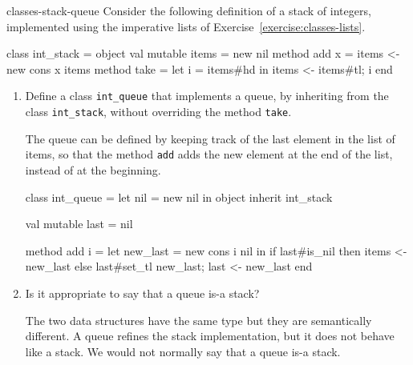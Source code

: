 %
\begin{exercise}{classes-stack-queue}
Consider the following definition of a stack of integers, implemented using the
imperative lists of Exercise~\ref{exercise:classes-lists}.

\begin{ocaml}
class int_stack =
object
    val mutable items = new nil
    method add x = items <- new cons x items
    method take =
        let i = items#hd in
        items <- items#tl;
        i
end
\end{ocaml}
%
\begin{enumerate}
\item

Define a class \hbox{\lstinline/int_queue/} that implements a queue, by inheriting from
the class \hbox{\lstinline/int_stack/}, without overriding the method \hbox{\lstinline/take/}.

\begin{answer}\ifanswers
The queue can be defined by keeping track of the last element in the list of items,
so that the method \hbox{\lstinline/add/} adds the new element at the end of the list,
instead of at the beginning.

\begin{ocamllisting}
class int_queue =
let nil = new nil in
object
   inherit int_stack

   val mutable last = nil

   method add i =
      let new_last = new cons i nil in
      if last#is_nil then
         items <- new_last
      else
         last#set_tl new_last;
      last <- new_last
end
\end{ocamllisting}
\fi\end{answer}

\item Is it appropriate to say that a queue is-a stack?
\begin{answer}\ifanswers
The two data structures have the same type but they are semantically different.
A queue refines the stack implementation, but it does not behave like a stack.
We would not normally say that a queue is-a stack.
\fi\end{answer}
\end{enumerate}
\end{exercise}

